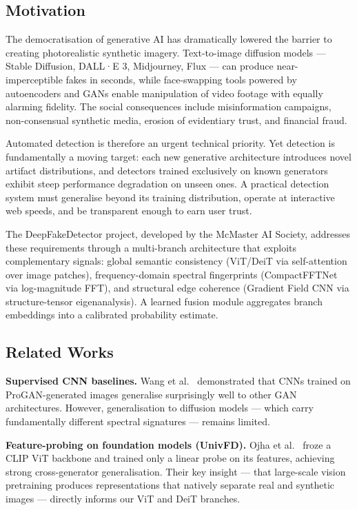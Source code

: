 \documentclass[12pt, a4paper]{article}
\begin{document}
\subsection{Motivation}

The democratisation of generative AI has dramatically lowered the barrier to
creating photorealistic synthetic imagery.  Text-to-image diffusion models —
Stable Diffusion, DALL·E 3, Midjourney, Flux — can produce near-imperceptible
fakes in seconds, while face-swapping tools powered by autoencoders and GANs
enable manipulation of video footage with equally alarming fidelity.  The social
consequences include misinformation campaigns, non-consensual synthetic media,
erosion of evidentiary trust, and financial fraud.

Automated detection is therefore an urgent technical priority.  Yet detection is
fundamentally a moving target: each new generative architecture introduces novel
artifact distributions, and detectors trained exclusively on known generators
exhibit steep performance degradation on unseen ones.  A practical detection
system must generalise beyond its training distribution, operate at interactive
web speeds, and be transparent enough to earn user trust.

The DeepFakeDetector project, developed by the McMaster AI Society, addresses
these requirements through a multi-branch architecture that exploits
complementary signals: global semantic consistency (ViT/DeiT via self-attention
over image patches), frequency-domain spectral fingerprints (CompactFFTNet via
log-magnitude FFT), and structural edge coherence (Gradient Field CNN via
structure-tensor eigenanalysis).  A learned fusion module aggregates branch
embeddings into a calibrated probability estimate.

\subsection{Related Works}
\label{sec:related}

\textbf{Supervised CNN baselines.}
Wang et al.~\cite{wang2020cnn} demonstrated that CNNs trained on ProGAN-generated
images generalise surprisingly well to other GAN architectures.  However,
generalisation to diffusion models — which carry fundamentally different spectral
signatures — remains limited.

\textbf{Feature-probing on foundation models (UnivFD).}
Ojha et al.~\cite{ojha2023univfd} froze a CLIP ViT backbone and trained only a
linear probe on its features, achieving strong cross-generator generalisation.
Their key insight — that large-scale vision pretraining produces representations
that natively separate real and synthetic images — directly informs our ViT and
DeiT branches.
\end{document}
